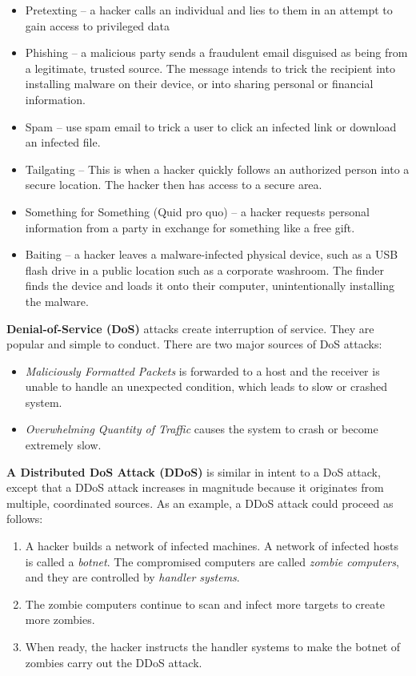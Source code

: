 \begin{itemize}
\item Pretexting -- a hacker calls an individual and lies to them in an attempt to gain access to privileged data
\item Phishing -- a malicious party sends a fraudulent email disguised as being from a legitimate, trusted source. The message intends to trick the recipient into installing malware on their device, or into sharing personal or financial information.
\item Spam -- use spam email to trick a user to click an infected link or download an infected file.
\item Tailgating -- This is when a hacker quickly follows an authorized person into a secure location. The hacker then has access to a secure area.
\item Something for Something (Quid pro quo) -- a hacker requests personal information from a party in exchange for something like a free gift.
\item Baiting -- a hacker leaves a malware-infected physical device, such as a USB flash drive in a public location such as a corporate washroom. The finder finds the device and loads it onto their computer, unintentionally installing the malware.
\end{itemize}

\textbf{Denial-of-Service (DoS)} attacks create interruption of service. They are popular and simple to conduct. There are two major sources of DoS attacks:

\begin{itemize}
\item \emph{Maliciously Formatted Packets} is forwarded to a host and the receiver is unable to handle an unexpected condition, which leads to slow or crashed system.
\item \emph{Overwhelming Quantity of Traffic} causes the system to crash or become extremely slow.
\end{itemize}

\textbf{A Distributed DoS Attack (DDoS)} is similar in intent to a DoS attack, except that a DDoS attack increases in magnitude because it originates from multiple, coordinated sources. As an example, a DDoS attack could proceed as follows:

\begin{enumerate}
\item A hacker builds a network of infected machines. A network of infected hosts is called a \emph{botnet}. The compromised computers are called \emph{zombie computers}, and they are controlled by \emph{handler systems}.
\item The zombie computers continue to scan and infect more targets to create more zombies.
\item When ready, the hacker instructs the handler systems to make the botnet of zombies carry out the DDoS attack.
\end{enumerate}

